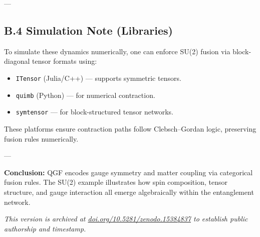 \documentclass[11pt]{article}
\def\frac#1#2{#1/#2}
\begin{document}
\begin{center}
\end{center}

---

\subsection*{B.4 Simulation Note (Libraries)}

To simulate these dynamics numerically, one can enforce SU(2) fusion via block-diagonal tensor formats using:

\begin{itemize}
  \item \texttt{ITensor} (Julia/C++) — supports symmetric tensors.
  \item \texttt{quimb} (Python) — for numerical contraction.
  \item \texttt{symtensor} — for block-structured tensor networks.
\end{itemize}

These platforms ensure contraction paths follow Clebsch–Gordan logic, preserving fusion rules numerically.

---

\textbf{Conclusion:} QGF encodes gauge symmetry and matter coupling via categorical fusion rules. The SU(2) example illustrates how spin composition, tensor structure, and gauge interaction all emerge algebraically within the entanglement network.






\vspace{1cm}
\noindent\textit{This version is archived at \href{https://doi.org/10.5281/zenodo.15384837}{doi.org/10.5281/zenodo.15384837} to establish public authorship and timestamp.}
\end{document}

